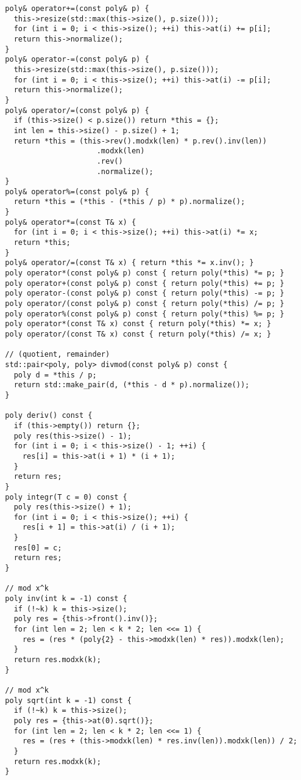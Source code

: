 \documentclass{article}
\begin{document}
\begin{multicols}{2}
\begin{lstlisting}
  poly& operator+=(const poly& p) {
    this->resize(std::max(this->size(), p.size()));
    for (int i = 0; i < this->size(); ++i) this->at(i) += p[i];
    return this->normalize();
  }
  poly& operator-=(const poly& p) {
    this->resize(std::max(this->size(), p.size()));
    for (int i = 0; i < this->size(); ++i) this->at(i) -= p[i];
    return this->normalize();
  }
  poly& operator/=(const poly& p) {
    if (this->size() < p.size()) return *this = {};
    int len = this->size() - p.size() + 1;
    return *this = (this->rev().modxk(len) * p.rev().inv(len))
                       .modxk(len)
                       .rev()
                       .normalize();
  }
  poly& operator%=(const poly& p) {
    return *this = (*this - (*this / p) * p).normalize();
  }
  poly& operator*=(const T& x) {
    for (int i = 0; i < this->size(); ++i) this->at(i) *= x;
    return *this;
  }
  poly& operator/=(const T& x) { return *this *= x.inv(); }
  poly operator*(const poly& p) const { return poly(*this) *= p; }
  poly operator+(const poly& p) const { return poly(*this) += p; }
  poly operator-(const poly& p) const { return poly(*this) -= p; }
  poly operator/(const poly& p) const { return poly(*this) /= p; }
  poly operator%(const poly& p) const { return poly(*this) %= p; }
  poly operator*(const T& x) const { return poly(*this) *= x; }
  poly operator/(const T& x) const { return poly(*this) /= x; }

  // (quotient, remainder)
  std::pair<poly, poly> divmod(const poly& p) const {
    poly d = *this / p;
    return std::make_pair(d, (*this - d * p).normalize());
  }

  poly deriv() const {
    if (this->empty()) return {};
    poly res(this->size() - 1);
    for (int i = 0; i < this->size() - 1; ++i) {
      res[i] = this->at(i + 1) * (i + 1);
    }
    return res;
  }
  poly integr(T c = 0) const {
    poly res(this->size() + 1);
    for (int i = 0; i < this->size(); ++i) {
      res[i + 1] = this->at(i) / (i + 1);
    }
    res[0] = c;
    return res;
  }

  // mod x^k
  poly inv(int k = -1) const {
    if (!~k) k = this->size();
    poly res = {this->front().inv()};
    for (int len = 2; len < k * 2; len <<= 1) {
      res = (res * (poly{2} - this->modxk(len) * res)).modxk(len);
    }
    return res.modxk(k);
  }

  // mod x^k
  poly sqrt(int k = -1) const {
    if (!~k) k = this->size();
    poly res = {this->at(0).sqrt()};
    for (int len = 2; len < k * 2; len <<= 1) {
      res = (res + (this->modxk(len) * res.inv(len)).modxk(len)) / 2;
    }
    return res.modxk(k);
  }


\end{lstlisting}
\end{multicols}
\end{document}
